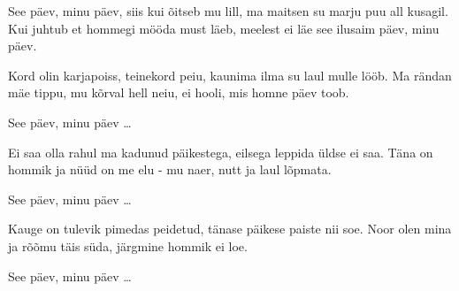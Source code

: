 
See p\"aev, minu p\"aev, siis kui \~oitseb mu lill,
ma maitsen su marju puu all kusagil.
Kui juhtub et hommegi m\"o\"oda must l\"aeb,
meelest ei l\"ae see ilusaim p\"aev, minu p\"aev.

Kord olin karjapoiss, teinekord peiu,
kaunima ilma su laul mulle l\"o\"ob.
Ma r\"andan m\"ae tippu, mu k\~orval hell neiu,
ei hooli, mis homne p\"aev toob.

See p\"aev, minu p\"aev \ldots

Ei saa olla rahul ma kadunud p\"aikestega,
eilsega leppida \"uldse ei saa.
T\"ana on hommik ja n\"u\"ud on me elu -
mu naer, nutt ja laul l\~opmata.

See p\"aev, minu p\"aev \ldots

Kauge on tulevik pimedas peidetud,
t\"anase p\"aikese paiste nii soe.
Noor olen mina ja r\~o\~omu t\"ais s\"uda,
j\"argmine hommik ei loe.

See p\"aev, minu p\"aev \ldots